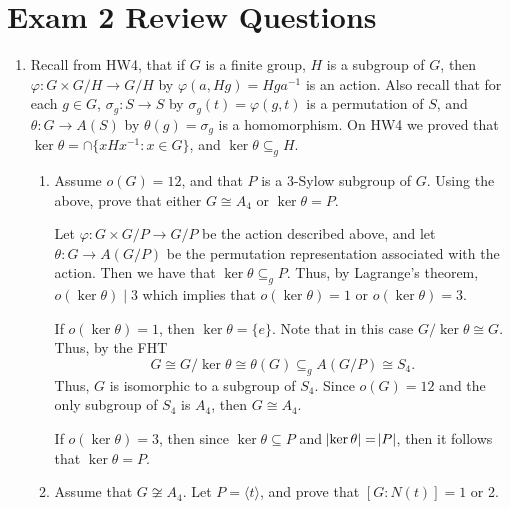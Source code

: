 \documentclass{article}
\makeatletter
\theoremstyle{definition}
\theoremstyle{remark}
\let\oldproofname=\proofname
\renewcommand{\proofname}{\bf{\textit{\oldproofname}}}
\theoremstyle{definition}
\renewenvironment{proof*}[1][\proofname]{\par
  \pushQED{\qed}%
  \normalfont \topsep6\p@\@plus6\p@\relax
  \list{}{\leftmargin=0mm
          \rightmargin=0mm
          \settowidth{\itemindent}{\itshape#1}%
          \labelwidth=\itemindent
          \parsep=0pt \listparindent=0mm%
  }
  \item[\hskip\labelsep
        \itshape
    #1\@addpunct{.}]\ignorespaces
}{%
  \popQED\endlist\@endpefalse
}
\makeatother
\begin{document}
    \section{Exam 2 Review Questions}
    
    \begin{enumerate}[leftmargin=*]
        \item Recall from HW4, that if $G$ is a finite group, $H$ is a subgroup of $G$, then $\varphi\colon G\times G/H\rightarrow G/H$ by $\varphi(a,Hg)=Hga^{-1}$ is an action. Also recall that for each $g\in G$, $\sigma_g\colon S\rightarrow S$ by $\sigma_g(t)=\varphi(g,t)$ is a permutation of $S$, and $\theta\colon G\rightarrow A(S)$ by $\theta(g)=\sigma_g$ is a homomorphism. On HW4 we proved that $\ker\theta=\cap\{xHx^{-1}\colon x\in G\}$, and $\ker\theta\subseteq_g H$.
            \begin{enumerate}[label=(\alph*)]
                \item Assume $o(G)=12$, and that $P$ is a 3-Sylow subgroup of $G$. Using the above, prove that either $G\cong A_4$ or $\ker\theta=P$.
                    \begin{proof*}
                        Let $\varphi\colon G\times G/P\rightarrow G/P$ be the action described above, and let $\theta\colon G\rightarrow A(G/P)$ be the permutation representation associated with the action. Then we have that $\ker\theta\subseteq_g P$. Thus, by Lagrange's theorem, $o(\ker\theta)\mid 3$ which implies that $o(\ker\theta)=1$ or $o(\ker\theta)=3$.\par\hspace{4mm} If $o(\ker\theta)=1$, then $\ker\theta=\{e\}$. Note that in this case $G/\ker\theta\cong G$. Thus, by the FHT
                            \begin{equation*}
                                G\cong G/\ker\theta\cong\theta(G)\subseteq_g A(G/P)\cong S_4.
                            \end{equation*}
                        Thus, $G$ is isomorphic to a subgroup of $S_4$. Since $o(G)=12$ and the only subgroup of $S_4$ is $A_4$, then $G\cong A_4$.\par\hspace{4mm} If $o(\ker\theta)=3$, then since $\ker\theta\subseteq P$ and $\abs{\ker\theta}=\abs{P}$, then it follows that $\ker\theta=P$.
                    \end{proof*}
                \item Assume that $G\not\cong A_4$. Let $P=\langle t\rangle$, and prove that $[G\colon N(t)]=1$ or 2.

\end{enumerate}
\end{enumerate}
\end{document}
